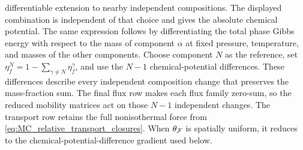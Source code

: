 differentiable extension to nearby independent compositions.  The displayed
combination is independent of that choice and gives the absolute chemical
potential.  The same expression follows by differentiating the total phase
Gibbs energy with respect to the mass of component \(\alpha\) at fixed
pressure, temperature, and masses of the other components.  Choose component
\(N\) as the reference, set
\(\eta_f^N=1-\sum_{\gamma\ne N}\eta_f^\gamma\), and use the \(N-1\)
chemical-potential differences.  These differences describe every independent
composition change that preserves the mass-fraction sum.  The final flux row
makes each flux family zero-sum, so the reduced mobility matrices act on those
\(N-1\) independent changes.  The transport row retains the full
nonisothermal force from \eqref{eq:MC_relative_transport_closures}.  When
\(\theta_{\mathcal{F}}\) is spatially uniform, it reduces to the
chemical-potential-difference gradient used below.

